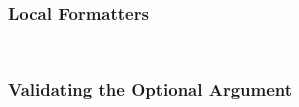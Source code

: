 \documentclass[12pt]{scrartcl}
\begin{document}
\subsubsection{Local Formatters}
\label{sec:examples:local-formatters}

\inputminted{lua}{examples/local-formatters.lua}

\inputminted{tex}{examples/local-formatters.tex}


\subsubsection{Validating the Optional Argument}
\label{sec:examples:validating-optional-argument}

\inputminted{lua}{examples/validate-options.lua}

\inputminted{tex}{examples/validate-options.tex}
\end{document}
